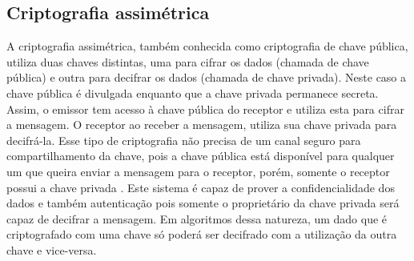 %
%
\subsection{Criptografia assimétrica}
A criptografia assimétrica, também conhecida como criptografia de chave pública, utiliza duas chaves distintas, uma para cifrar os dados (chamada de chave pública) e outra para decifrar os dados (chamada de chave privada). Neste caso a chave pública é divulgada enquanto que a chave privada permanece secreta. Assim, o emissor tem acesso à chave pública do receptor e utiliza esta para cifrar a mensagem. O receptor ao receber a mensagem, utiliza sua chave privada para decifrá-la. Esse tipo de criptografia não precisa de um canal seguro para compartilhamento da chave, pois a chave pública está disponível para qualquer um que queira enviar a mensagem para o receptor, porém, somente o receptor possui a chave privada \cite{Cavalcante:2015}.
Este sistema é capaz de prover a confidencialidade dos dados e também autenticação pois somente o proprietário da chave privada será capaz de decifrar a mensagem. Em algoritmos dessa natureza, um dado que é criptografado com uma chave só poderá ser decifrado com a utilização da outra chave e vice-versa.
